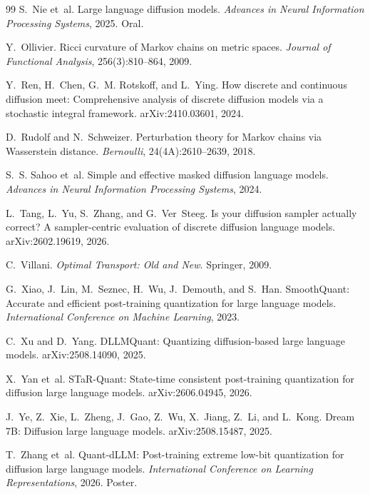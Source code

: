 \begin{thebibliography}{99}
S.~Nie et~al.
Large language diffusion models.
\emph{Advances in Neural Information Processing Systems}, 2025. Oral.

Y.~Ollivier.
Ricci curvature of Markov chains on metric spaces.
\emph{Journal of Functional Analysis}, 256(3):810--864, 2009.

Y.~Ren, H.~Chen, G.~M. Rotskoff, and L.~Ying.
How discrete and continuous diffusion meet: Comprehensive analysis of discrete diffusion models via a stochastic integral framework.
arXiv:2410.03601, 2024.

D.~Rudolf and N.~Schweizer.
Perturbation theory for Markov chains via Wasserstein distance.
\emph{Bernoulli}, 24(4A):2610--2639, 2018.

S.~S. Sahoo et~al.
Simple and effective masked diffusion language models.
\emph{Advances in Neural Information Processing Systems}, 2024.

L.~Tang, L.~Yu, S.~Zhang, and G.~Ver~Steeg.
Is your diffusion sampler actually correct? A sampler-centric evaluation of discrete diffusion language models.
arXiv:2602.19619, 2026.

C.~Villani.
\emph{Optimal Transport: Old and New}.
Springer, 2009.

G.~Xiao, J.~Lin, M.~Seznec, H.~Wu, J.~Demouth, and S.~Han.
SmoothQuant: Accurate and efficient post-training quantization for large language models.
\emph{International Conference on Machine Learning}, 2023.

C.~Xu and D.~Yang.
DLLMQuant: Quantizing diffusion-based large language models.
arXiv:2508.14090, 2025.

X.~Yan et~al.
STaR-Quant: State-time consistent post-training quantization for diffusion large language models.
arXiv:2606.04945, 2026.

J.~Ye, Z.~Xie, L.~Zheng, J.~Gao, Z.~Wu, X.~Jiang, Z.~Li, and L.~Kong.
Dream 7B: Diffusion large language models.
arXiv:2508.15487, 2025.

T.~Zhang et~al.
Quant-dLLM: Post-training extreme low-bit quantization for diffusion large language models.
\emph{International Conference on Learning Representations}, 2026. Poster.

\end{thebibliography}
